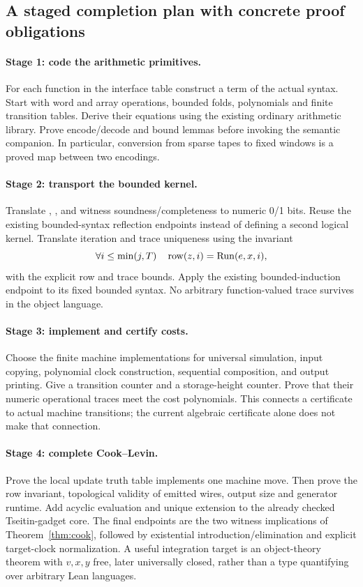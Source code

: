 \subsection{A staged completion plan with concrete proof obligations}

\paragraph{Stage 1: code the arithmetic primitives.}
For each function in the interface table construct a term of the actual
 syntax. Start with word and array operations, bounded folds,
polynomials and finite transition tables. Derive their equations using the
existing ordinary arithmetic library. Prove encode/decode and bound lemmas
before invoking the semantic companion. In particular, conversion from
sparse tapes to fixed windows is a proved map between two encodings.

\paragraph{Stage 2: transport the bounded kernel.}
Translate , , and witness
soundness/completeness to numeric 0/1 bits. Reuse the existing bounded-syntax
reflection endpoints instead of defining a second logical kernel. Translate
iteration and trace uniqueness using the invariant
\[
 \forall i\le\min(j,T)\quad
 \operatorname{row}(z,i)=\operatorname{Run}(e,x,i),
\]
with the explicit row and trace bounds. Apply the existing bounded-induction
endpoint to its fixed bounded syntax. No arbitrary function-valued trace
survives in the object language.

\paragraph{Stage 3: implement and certify costs.}
Choose the finite machine implementations for universal simulation, input
copying, polynomial clock construction, sequential composition, and output
printing. Give a transition counter and a storage-height counter. Prove
that their numeric operational traces meet the cost polynomials. This
connects a  certificate to actual machine transitions;
the current algebraic certificate alone does not make that connection.

\paragraph{Stage 4: complete Cook--Levin.}
Prove the local update truth table implements one machine move. Then prove
the row invariant, topological validity of emitted wires, output size and
generator runtime. Add acyclic evaluation and unique extension to the
already checked Tseitin-gadget core. The final endpoints are the two
witness implications of Theorem~\ref{thm:cook}, followed by existential
introduction/elimination and explicit target-clock normalization. A useful
integration target is an object-theory theorem with \(v,x,y\) free, later
universally closed, rather than a type quantifying over arbitrary Lean
languages.


